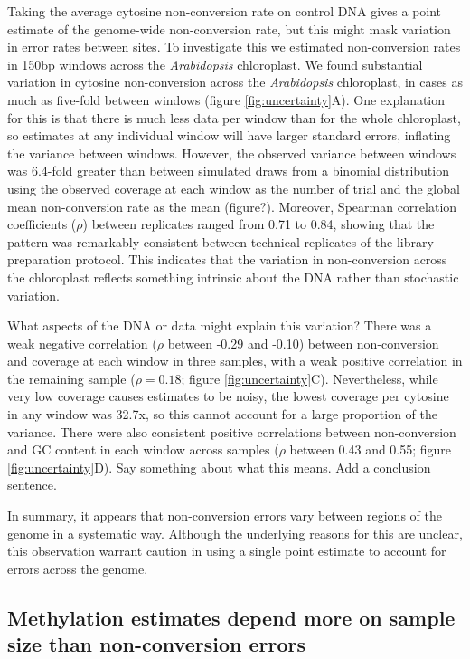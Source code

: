 \documentclass[12pt,longbibliography]{article}
\begin{document}
Taking the average cytosine non-conversion rate on control DNA gives a point estimate of the genome-wide non-conversion rate, but this might mask variation in error rates between sites.
To investigate this we estimated non-conversion rates in 150bp windows across the \textit{Arabidopsis} chloroplast.
We found substantial variation in cytosine non-conversion across the \textit{Arabidopsis} chloroplast, in cases as much as five-fold between windows (figure \ref{fig:uncertainty}A).
One explanation for this is that there is much less data per window than for the whole chloroplast, so estimates at any individual window will have larger standard errors, inflating the variance between windows.
However, the observed variance between windows was 6.4-fold greater than between simulated draws from a binomial distribution using the observed coverage at each window as the number of trial and the global mean non-conversion rate as the mean (figure?).
Moreover, Spearman correlation coefficients ($\rho$) between replicates ranged from 0.71 to 0.84, showing that the pattern was remarkably consistent between technical replicates of the library preparation protocol.
This indicates that the variation in non-conversion across the chloroplast reflects something intrinsic about the DNA rather than stochastic variation.

What aspects of the DNA or data might explain this variation?
There was a weak negative correlation ($\rho$ between -0.29 and -0.10) between non-conversion and coverage at each window in three samples, with a weak positive correlation in the remaining sample ($\rho = 0.18$; figure \ref{fig:uncertainty}C).
Nevertheless, while very low coverage causes estimates to be noisy, the lowest coverage per cytosine in any window was 32.7x, so this cannot account for a large proportion of the variance.
There were also consistent positive correlations between non-conversion and GC content in each window across samples ($\rho$ between 0.43 and 0.55; figure \ref{fig:uncertainty}D).
Say something about what this means.
Add a conclusion sentence.

In summary, it appears that non-conversion errors vary between regions of the genome in a systematic way. Although the underlying reasons for this are unclear, this observation warrant caution in using a single point estimate to account for errors across the genome.

\subsection{Methylation estimates depend more on sample size than non-conversion errors}
\end{document}

